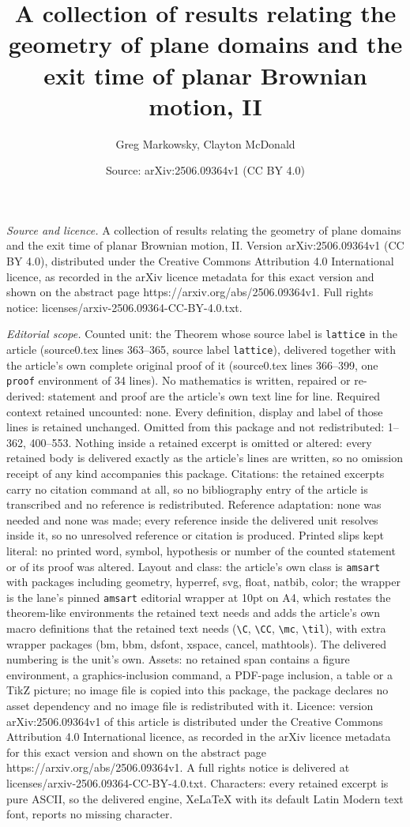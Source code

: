 \documentclass[10pt,a4paper]{amsart}
\title[A collection of results relating the geometry of plane domai]{A collection of results relating the geometry of plane domains and the exit time of planar Brownian motion, II}
\author{Greg Markowsky, Clayton McDonald}
\date{Source: arXiv:2506.09364v1 (CC BY 4.0)}
\begin{document}
\maketitle

\noindent\emph{Source and licence.} A collection of results relating the geometry of plane domains and the exit time of planar Brownian motion, II. Version arXiv:2506.09364v1 (CC BY 4.0), distributed under the Creative Commons Attribution 4.0 International licence, as recorded in the arXiv licence metadata for this exact version and shown on the abstract page https://arxiv.org/abs/2506.09364v1. Full rights notice: licenses/arxiv-2506.09364-CC-BY-4.0.txt.\par\smallskip

\noindent\textit{Editorial scope.} Counted unit: the Theorem whose source label is \texttt{lattice} in the article (source0.tex lines 363--365, source label \texttt{lattice}), delivered together with the article's own complete original proof of it (source0.tex lines 366--399, one \texttt{proof} environment of 34 lines). No mathematics is written, repaired or re-derived: statement and proof are the article's own text line for line. Required context retained uncounted: none. Every definition, display and label of those lines is retained unchanged. Omitted from this package and not redistributed: 1--362, 400--553. Nothing inside a retained excerpt is omitted or altered: every retained body is delivered exactly as the article's lines are written, so no omission receipt of any kind accompanies this package. Citations: the retained excerpts carry no citation command at all, so no bibliography entry of the article is transcribed and no reference is redistributed. Reference adaptation: none was needed and none was made; every reference inside the delivered unit resolves inside it, so no unresolved reference or citation is produced. Printed slips kept literal: no printed word, symbol, hypothesis or number of the counted statement or of its proof was altered. Layout and class: the article's own class is \texttt{amsart} with packages including geometry, hyperref, svg, float, natbib, color; the wrapper is the lane's pinned \texttt{amsart} editorial wrapper at 10pt on A4, which restates the theorem-like environments the retained text needs and adds the article's own macro definitions that the retained text needs (\texttt{\textbackslash C}, \texttt{\textbackslash CC}, \texttt{\textbackslash mc}, \texttt{\textbackslash til}), with extra wrapper packages (bm, bbm, dsfont, xspace, cancel, mathtools). The delivered numbering is the unit's own. Assets: no retained span contains a figure environment, a graphics-inclusion command, a PDF-page inclusion, a table or a TikZ picture; no image file is copied into this package, the package declares no asset dependency and no image file is redistributed with it. Licence: version arXiv:2506.09364v1 of this article is distributed under the Creative Commons Attribution 4.0 International licence, as recorded in the arXiv licence metadata for this exact version and shown on the abstract page https://arxiv.org/abs/2506.09364v1. A full rights notice is delivered at licenses/arxiv-2506.09364-CC-BY-4.0.txt. Characters: every retained excerpt is pure ASCII, so the delivered engine, XeLaTeX with its default Latin Modern text font, reports no missing character.
\end{document}
